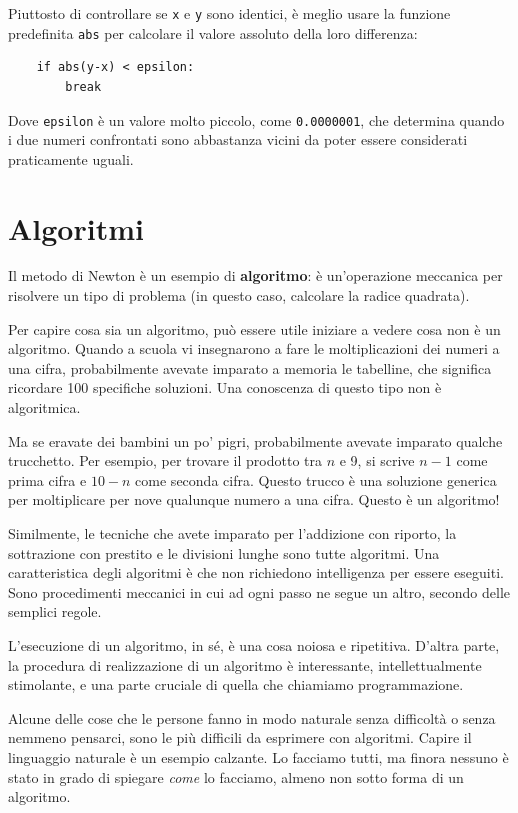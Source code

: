 \documentclass[10pt]{book}
\begin{document}
Piuttosto di controllare se {\tt x} e {\tt y} sono identici, è meglio usare la funzione predefinita {\tt abs} per calcolare il valore assoluto della loro differenza:

\begin{verbatim}
    if abs(y-x) < epsilon:
        break
\end{verbatim}
%
Dove \verb"epsilon" è un valore molto piccolo, come {\tt 0.0000001}, che determina quando i due numeri confrontati sono abbastanza vicini da poter essere considerati praticamente uguali.


\section{Algoritmi}

Il metodo di Newton è un esempio di {\bf algoritmo}: è un'operazione meccanica per risolvere un tipo di problema (in questo caso, calcolare la radice quadrata).

Per capire cosa sia un algoritmo, può essere utile iniziare a vedere cosa non è un algoritmo. Quando a scuola vi insegnarono a fare le moltiplicazioni dei numeri a una cifra, probabilmente avevate imparato a memoria le tabelline, che significa ricordare 100 specifiche soluzioni. Una conoscenza di questo tipo non è algoritmica.

Ma se eravate dei bambini un po' pigri, probabilmente avevate imparato qualche trucchetto. Per esempio, per trovare il prodotto tra $n$ e 9, si scrive $n-1$ come prima cifra e $10-n$ come seconda cifra. Questo trucco è una soluzione generica per moltiplicare per nove qualunque numero a una cifra. Questo è un algoritmo!

Similmente, le tecniche che avete imparato per l'addizione con riporto, la sottrazione con prestito e le divisioni lunghe sono tutte algoritmi. Una caratteristica degli algoritmi è che non richiedono intelligenza per essere eseguiti. Sono procedimenti meccanici in cui ad ogni passo ne segue un altro, secondo delle semplici regole.

L'esecuzione di un algoritmo, in sé, è una cosa noiosa e ripetitiva. D'altra parte, la procedura di realizzazione di un algoritmo è interessante, intellettualmente stimolante, e una parte cruciale di quella che chiamiamo programmazione.

Alcune delle cose che le persone fanno in modo naturale senza difficoltà o senza nemmeno pensarci, sono le più difficili da esprimere con algoritmi. Capire il linguaggio naturale è un esempio calzante. Lo facciamo tutti, ma finora nessuno è stato in grado di spiegare {\em come} lo facciamo, almeno non sotto forma di un algoritmo.
\end{document}
